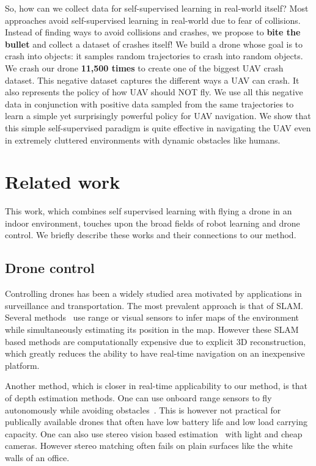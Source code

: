 \documentclass[letterpaper, 10 pt, conference]{ieeeconf}  %
\begin{document}
So, how can we collect data for self-supervised learning in real-world itself? Most approaches avoid self-supervised learning in real-world due to fear of collisions. Instead of finding ways to avoid collisions and crashes, we propose to {\bf bite the bullet} and collect a dataset of crashes itself! We build a drone whose goal is to crash into objects: it samples random trajectories to crash into random objects. We crash our drone {\bf 11,500 times} to create one of the biggest UAV crash dataset. This negative dataset captures the different ways a UAV can crash. It also represents the policy of how UAV should NOT fly. We use all this negative data in conjunction with positive data sampled from the same trajectories to learn a simple yet surprisingly powerful policy for UAV navigation. We show that this simple self-supervised paradigm is quite effective in navigating the UAV even in extremely cluttered environments with dynamic obstacles like humans.
\section{Related work}
This work, which combines self supervised learning with flying a drone in an indoor environment, touches upon the broad fields of robot learning and drone control. We briefly describe these works and their connections to our method.

\subsection{Drone control}
Controlling drones has been a widely studied area motivated by applications in surveillance and transportation. The most prevalent approach is that of SLAM. Several methods~\cite{engel2014lsd,mei2011rslam,bachrach2009autonomous,zhang2012microsoft,henry2012rgb, schmid2013stereo,bills2011autonomous} use range or visual sensors to infer maps of the environment while simultaneously estimating its position in the map. However these SLAM based methods are computationally expensive due to explicit 3D reconstruction, which greatly reduces the ability to have real-time navigation on an inexpensive platform.

Another method, which is closer in real-time applicability to our method, is that of depth estimation methods. One can use onboard range sensors to fly autonomously while avoiding obstacles~\cite{roberts2007quadrotor,bry2012state}. This is however not practical for publically available drones that often have low battery life and low load carrying capacity. One can also use stereo vision based estimation~\cite{achtelik2009stereo,fraundorfer2012vision} with light and cheap cameras. However stereo matching often fails on plain surfaces like the white walls of an office.
\end{document}
